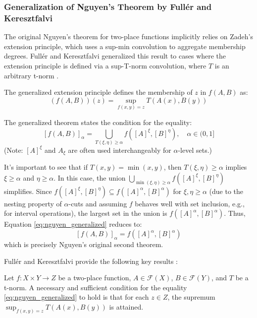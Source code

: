 \subsubsection{Generalization of Nguyen's Theorem by Fullér and Keresztfalvi}
The original Nguyen's theorem for two-place functions implicitly relies on Zadeh's extension principle, which uses a sup-min convolution to aggregate membership degrees. Fullér and Keresztfalvi generalized this result to cases where the extension principle is defined via a sup-T-norm convolution, where $T$ is an arbitrary t-norm \cite[Sec. 1.9]{FULLER2}.

The generalized extension principle defines the membership of $z$ in $f(A,B)$ as:
\[
(f(A,B))(z) = \sup_{f(x,y)=z} T(A(x), B(y))
\]

The generalized theorem states the condition for the equality:
\begin{equation} \label{eq:nguyen_generalized}
[f(A, B)]_\alpha = \bigcup_{T(\xi, \eta) \ge \alpha} f([A]^\xi, [B]^\eta), \quad \alpha \in (0, 1]
\end{equation}
(Note: $[A]^\xi$ and $A_\xi$ are often used interchangeably for $\alpha$-level sets.)

It's important to see that if $T(x,y) = \min(x,y)$, then $T(\xi, \eta) \ge \alpha$ implies $\xi \ge \alpha$ and $\eta \ge \alpha$. In this case, the union $\bigcup_{\min(\xi, \eta) \ge \alpha} f([A]^\xi, [B]^\eta)$ simplifies. Since $f([A]^\xi, [B]^\eta) \subseteq f([A]^\alpha, [B]^\alpha)$ for $\xi, \eta \ge \alpha$ (due to the nesting property of $\alpha$-cuts and assuming $f$ behaves well with set inclusion, e.g., for interval operations), the largest set in the union is $f([A]^\alpha, [B]^\alpha)$. Thus, Equation \eqref{eq:nguyen_generalized} reduces to:
\[
[f(A, B)]_\alpha = f([A]^\alpha, [B]^\alpha)
\]
which is precisely Nguyen's original second theorem.

Fullér and Keresztfalvi provide the following key results \cite[Thms. 1.9.1, 1.9.2]{FULLER2}:
\begin{theorem}
    Let $f: X \times Y \to Z$ be a two-place function, $A \in \mathcal{F}(X)$, $B \in \mathcal{F}(Y)$, and $T$ be a t-norm. A necessary and sufficient condition for the equality \eqref{eq:nguyen_generalized} to hold is that for each $z \in Z$, the supremum $\sup_{f(x,y)=z} T(A(x), B(y))$ is attained.
\end{theorem}

